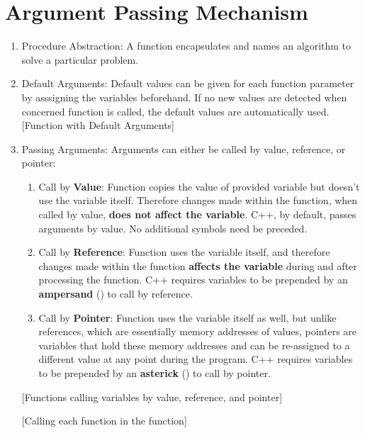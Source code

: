 \section{Argument Passing Mechanism}
\begin{enumerate}
\item Procedure Abstraction: A function encapsulates and names an algorithm to
    solve a particular problem.
\item Default Arguments: Default values can be given for each function parameter
    by asssigning the variables beforehand. If no new values are detected when
    concerned function is called, the default values are automatically used.
    \begingroup
    [Function with Default Arguments]
    \endgroup
\item Passing Arguments: Arguments can either be called by value, reference, or
    pointer:
    \begin{enumerate}
    \item Call by \textbf{Value}: Function copies the value of provided variable
        but doesn't use the variable itself. Therefore changes made within the
        function, when called by value, \textbf{does not affect the variable}.
        C++, by default, passes arguments by value. No additional symbols need
        be preceded.
    \item Call by \textbf{Reference}: Function uses the variable itself, and
        therefore changes made within the function \textbf{affects the variable}
        during and after processing the function. C++ requires variables to be
        prepended by an \textbf{ampersand} (\imc{&}) to call by reference.
    \item Call by \textbf{Pointer}: Function uses the variable itself as well,
        but unlike references, which are essentially memory addresses of values,
        pointers are variables that hold these memory addresses and can be
        re-assigned to a different value at any point during the program. C++
        requires variables to be prepended by an \textbf{asterick} (\imc{*}) to
        call by pointer.
    \end{enumerate}
    \begin{minipage}{.5\textwidth}
    [Functions calling variables by value,
    reference, and pointer] \end{minipage}
    \begin{minipage}{.5\textwidth}
    [Calling each function in the 
    function] \end{minipage}
\end{enumerate}

